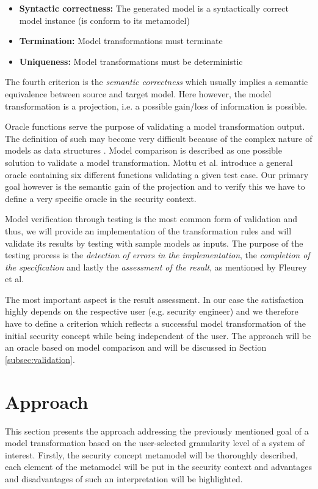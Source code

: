 \begin{itemize}
\item[]\textbf{Syntactic correctness:} The generated model is a syntactically correct model instance (is conform to its metamodel)
\item[]\textbf{Termination:} Model transformations must terminate
\item[]\textbf{Uniqueness:} Model transformations must be deterministic 
\end{itemize}

The fourth criterion is the \textit{semantic correctness} which usually implies a semantic equivalence between source and target model. Here however, the model transformation is a projection, i.e. a possible gain/loss of information is possible.  

Oracle functions serve the purpose of validating a model transformation output. The definition of such may become very difficult because of the complex nature of models as data structures \cite{mottu}. Model comparison is described as one possible solution to validate a model transformation.  Mottu et al. introduce a general oracle containing six different functions validating a given test case. Our primary goal however is the semantic gain of the projection and to verify this we have to define a very specific oracle in the security context. 

Model verification through testing is the most common form of validation \cite{fleurey} and thus, we will provide an implementation of the transformation rules and will validate its results by testing with sample models as inputs. The purpose of the testing process is the \textit{detection of errors in the implementation}, the \textit{completion of the specification} and lastly the \textit{assessment of the result}, as mentioned by Fleurey et al.

The most important aspect is the result assessment. In our case the satisfaction highly depends on the respective user (e.g. security engineer) and we therefore have to define a criterion which reflects a successful model transformation of the initial security concept while being independent of the user. The approach will be an oracle based on model comparison and will be discussed in Section \ref{subsec:validation}.
 
\section{Approach}
This section presents the approach addressing the previously mentioned goal of a model transformation based on the user-selected granularity level of a system of interest. Firstly, the security concept metamodel will be thoroughly described, each element of the metamodel will be put in the security context and advantages and disadvantages of such an interpretation will be highlighted.

